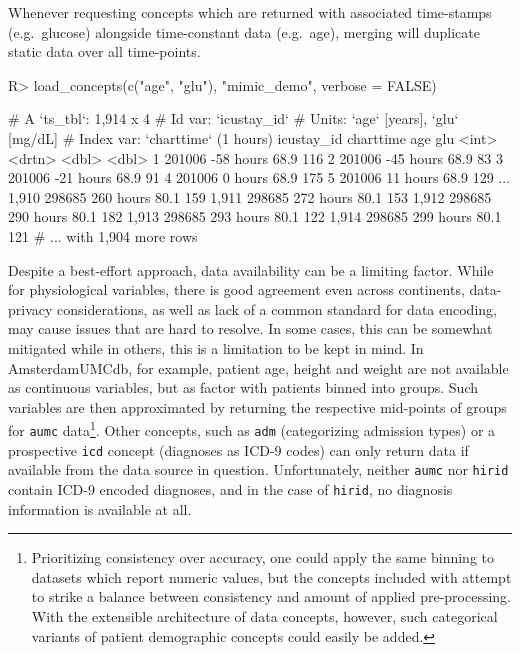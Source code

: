 \documentclass[
]{jss}
\begin{document}
Whenever requesting concepts which are returned with associated
time-stamps (e.g.~glucose) alongside time-constant data (e.g.~age),
merging will duplicate static data over all time-points.

\begin{CodeChunk}
\begin{CodeInput}
R> load_concepts(c("age", "glu"), "mimic_demo", verbose = FALSE)
\end{CodeInput}
\begin{CodeOutput}
# A `ts_tbl`: 1,914 x 4
# Id var:     `icustay_id`
# Units:      `age` [years], `glu` [mg/dL]
# Index var:  `charttime` (1 hours)
      icustay_id charttime   age   glu
           <int> <drtn>    <dbl> <dbl>
    1     201006 -58 hours  68.9   116
    2     201006 -45 hours  68.9    83
    3     201006 -21 hours  68.9    91
    4     201006   0 hours  68.9   175
    5     201006  11 hours  68.9   129
  ...
1,910     298685 260 hours  80.1   159
1,911     298685 272 hours  80.1   153
1,912     298685 290 hours  80.1   182
1,913     298685 293 hours  80.1   122
1,914     298685 299 hours  80.1   121
# ... with 1,904 more rows
\end{CodeOutput}
\end{CodeChunk}

Despite a best-effort approach, data availability can be a limiting
factor. While for physiological variables, there is good agreement even
across continents, data-privacy considerations, as well as lack of a
common standard for data encoding, may cause issues that are hard to
resolve. In some cases, this can be somewhat mitigated while in others,
this is a limitation to be kept in mind. In AmsterdamUMCdb, for example,
patient age, height and weight are not available as continuous
variables, but as factor with patients binned into groups. Such
variables are then approximated by returning the respective mid-points
of groups for \texttt{aumc} data\footnote{Prioritizing consistency over
  accuracy, one could apply the same binning to datasets which report
  numeric values, but the concepts included with  attempt to
  strike a balance between consistency and amount of applied
  pre-processing. With the extensible architecture of data concepts,
  however, such categorical variants of patient demographic concepts
  could easily be added.}. Other concepts, such as \texttt{adm}
(categorizing admission types) or a prospective \texttt{icd} concept
(diagnoses as ICD-9 codes) can only return data if available from the
data source in question. Unfortunately, neither \texttt{aumc} nor
\texttt{hirid} contain ICD-9 encoded diagnoses, and in the case of
\texttt{hirid}, no diagnosis information is available at all.
\end{document}
